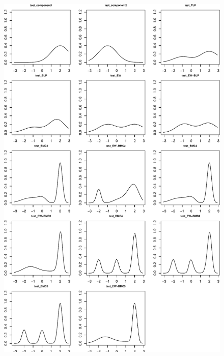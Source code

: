 \documentclass[
]{article}
\begin{document}
\begin{figure}[h]

{\centering \includegraphics{applied_blp_sim_files/figure-latex/unnamed-chunk-21-1} 

}

\end{figure}
\end{document}
